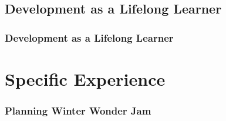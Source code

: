\documentclass{beamer}
\begin{document}

\subsection{Development as a Lifelong Learner}

\begin{frame}
\frametitle{Development as a Lifelong Learner}
\end{frame}

\section{Specific Experience}

\begin{frame}
\frametitle{Planning Winter Wonder Jam}
\begin{figure}[htp]
	\centering
	\quad
\end{figure}
\end{frame}
\end{document}
